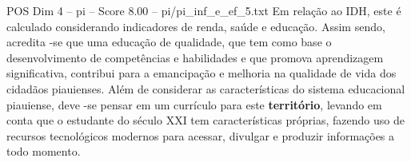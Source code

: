 \begin{textsample}{POS Dim 4 – pi – Score 8.00 – pi/pi\_inf\_e\_ef\_5.txt}
Em relação ao IDH, este é calculado considerando indicadores de renda, saúde e educação.
Assim sendo, acredita -se que uma educação de qualidade, que tem como base o desenvolvimento de competências e habilidades e que promova aprendizagem significativa, contribui para a emancipação e melhoria na qualidade de vida dos cidadãos piauienses.
Além de considerar as características do sistema educacional piauiense, deve -se pensar em um currículo para este \textbf{território}, levando em conta que o estudante do século XXI tem características próprias, fazendo uso de recursos tecnológicos modernos para acessar, divulgar e produzir informações a todo momento.

\end{textsample}
